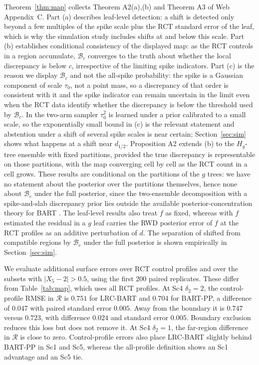 \documentclass[11pt]{article}
\theoremstyle{definition}
\theoremstyle{plain}
\begin{document}
Theorem~\ref{thm:map} collects Theorem A2(a),(b) and Theorem A3 of Web Appendix~C. Part (a) describes leaf-level detection: a shift is detected only beyond a few multiples of the spike scale plus the RCT standard error of the leaf, which is why the simulation study includes shifts at and below this scale. Part (b) establishes conditional consistency of the displayed map: as the RCT controls in a region accumulate, $\mathcal B_c$ converges to the truth about whether the local discrepancy is below $c$, irrespective of the limiting spike indicators. Part (c) is the reason we display $\mathcal B_c$ and not the all-spike probability: the spike is a Gaussian component of scale $\tau_0$, not a point mass, so a discrepancy of that order is consistent with it and the spike indicator can remain uncertain in the limit even when the RCT data identify whether the discrepancy is below the threshold used by $\mathcal B_c$. In the two-arm sampler $\tau_0^2$ is learned under a prior calibrated to a small scale, so the exponentially small bound in (c) is the relevant statement and abstention under a shift of several spike scales is near certain; Section~\ref{sec:sim} shows what happens at a shift near $d_{1/2}$. Proposition A2 extends (b) to the $H_g$-tree ensemble with fixed partitions, provided the true discrepancy is representable on those partitions, with the map converging cell by cell as the RCT count in a cell grows. These results are conditional on the partitions of the $g$ trees: we have no statement about the posterior over the partitions themselves, hence none about $\mathcal B_c$ under the full posterior, since the two-ensemble decomposition with a spike-and-slab discrepancy prior lies outside the available posterior-concentration theory for BART \citep{rockova2020bart}. The leaf-level results also treat $f$ as fixed, whereas with $f$ estimated the residual in a $g$ leaf carries the RWD posterior error of $f$ at the RCT profiles as an additive perturbation of $d$. The separation of shifted from compatible regions by $\mathcal B_c$ under the full posterior is shown empirically in Section~\ref{sec:sim}.


We evaluate additional surface errors over RCT control profiles and over the subsets with $|X_5-2|>0.5$, using the first $200$ paired replicates. These differ from Table~\ref{tab:map}, which uses all RCT profiles. At Sc4 $\delta_2=2$, the control-profile RMSE in $\mathcal R$ is $0.751$ for LRC-BART and $0.704$ for BART-PP, a difference of $0.047$ with paired standard error $0.005$. Away from the boundary it is $0.747$ versus $0.723$, with difference $0.024$ and standard error $0.005$. Boundary exclusion reduces this loss but does not remove it. At Sc4 $\delta_2=1$, the far-region difference in $\mathcal R$ is close to zero. Control-profile errors also place LRC-BART slightly behind BART-PP in Sc1 and Sc5, whereas the all-profile definition shows an Sc1 advantage and an Sc5 tie.
\end{document}
